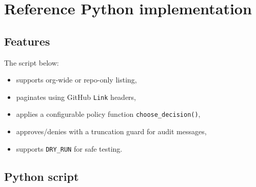 \documentclass[11pt]{article}
\begin{document}
\section{Reference Python implementation}

\subsection{Features}
The script below:
\begin{itemize}
  \item supports org-wide or repo-only listing,
  \item paginates using GitHub \texttt{Link} headers,
  \item applies a configurable policy function \texttt{choose\_decision()},
  \item approves/denies with a truncation guard for audit messages,
  \item supports \texttt{DRY\_RUN} for safe testing.
\end{itemize}

\subsection{Python script}
\end{document}
